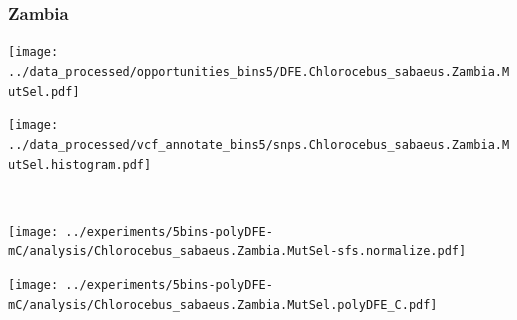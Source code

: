 \subsubsection{Zambia}

\begin{minipage}{0.49\linewidth}
    \texttt{[image: ../data\_processed/opportunities\_bins5/DFE.Chlorocebus\_sabaeus.Zambia.MutSel.pdf]}
\end{minipage}
\begin{minipage}{0.49\linewidth}
    \texttt{[image: ../data\_processed/vcf\_annotate\_bins5/snps.Chlorocebus\_sabaeus.Zambia.MutSel.histogram.pdf]}
\end{minipage}
\\
\begin{minipage}{0.49\linewidth}
    \texttt{[image: ../experiments/5bins-polyDFE-mC/analysis/Chlorocebus\_sabaeus.Zambia.MutSel-sfs.normalize.pdf]}
\end{minipage}
\begin{minipage}{0.4\linewidth}
    \texttt{[image: ../experiments/5bins-polyDFE-mC/analysis/Chlorocebus\_sabaeus.Zambia.MutSel.polyDFE\_C.pdf]}
\end{minipage}

